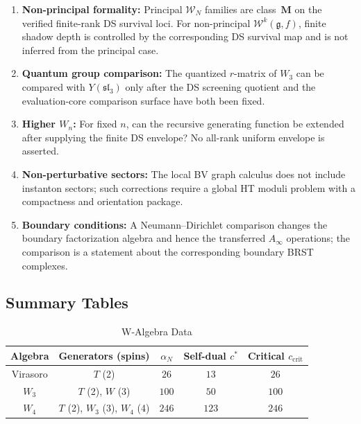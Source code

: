 \begin{enumerate}
\item \textbf{Non-principal formality:} Principal $\mathcal{W}_N$
families are class~$\mathbf{M}$ on the verified finite-rank DS
survival loci. For non-principal $\mathcal{W}^k(\mathfrak{g}, f)$,
finite shadow depth is controlled by the corresponding DS survival
map and is not inferred from the principal case.

\item \textbf{Quantum group comparison:} The quantized $r$-matrix of
$W_3$ can be compared with $Y(\mathfrak{sl}_3)$ only after the DS
screening quotient and the evaluation-core comparison surface have
both been fixed.

\item \textbf{Higher $W_n$:} For fixed $n$, can the recursive
generating function be extended after supplying the finite DS envelope?
No all-rank uniform envelope is asserted.

\item \textbf{Non-perturbative sectors:} The local BV graph calculus
does not include instanton sectors; such corrections require a global
HT moduli problem with a compactness and orientation package.

\item \textbf{Boundary conditions:} A Neumann--Dirichlet comparison
changes the boundary factorization algebra and hence the transferred
$A_\infty$ operations; the comparison is a statement about the
corresponding boundary BRST complexes.
\end{enumerate}

\subsection{Summary Tables}

\begin{table}[h]
\centering
\caption{W-Algebra Data}
\begin{tabular}{|c|c|c|c|c|}
\hline
Algebra & Generators (spins) & $\alpha_N$ & Self-dual $c^*$ & Critical $c_{\mathrm{crit}}$ \\
\hline
Virasoro & $T$ (2) & $26$ & $13$ & $26$ \\
$W_3$ & $T$ (2), $W$ (3) & $100$ & $50$ & $100$ \\
$W_4$ & $T$ (2), $W_3$ (3), $W_4$ (4) & $246$ & $123$ & $246$ \\
\hline
\end{tabular}
\end{table}

